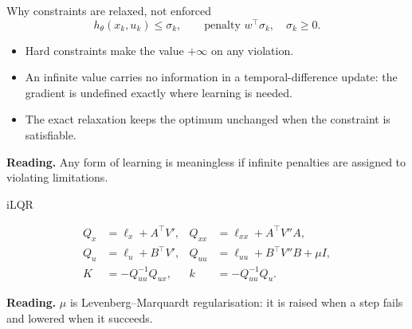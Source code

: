 \documentclass[10pt]{beamer}
\newcommand{\takeaway}[1]{\par\vfill{\footnotesize\textbf{Reading.} #1\par}}
\begin{document}
\begin{frame}{Why constraints are relaxed, not enforced}
  \[
    h_\theta(x_k,u_k)\le\sigma_k,
    \qquad\text{penalty } w^{\!\top}\sigma_k,\quad \sigma_k\ge0 .
  \]
  \begin{itemize}
    \item Hard constraints make the value $+\infty$ on any violation.
    \item An infinite value carries no information in a temporal-difference
      update: the gradient is undefined exactly where learning is needed.
    \item The exact relaxation keeps the optimum unchanged when the
      constraint is satisfiable.
  \end{itemize}
  \takeaway{Any form of learning is meaningless if infinite penalties are
    assigned to violating limitations.}
\end{frame}

\begin{frame}{iLQR}
  \centering
  \vspace{2pt}
  \small
  \begin{align*}
    Q_x &= \ell_x+A^{\!\top}V', &
    Q_{xx} &= \ell_{xx}+A^{\!\top}V''A,\\
    Q_u &= \ell_u+B^{\!\top}V', &
    Q_{uu} &= \ell_{uu}+B^{\!\top}V''B+\mu I,\\
    K &= -Q_{uu}^{-1}Q_{ux}, & k &= -Q_{uu}^{-1}Q_u .
  \end{align*}
  \normalsize
  \takeaway{$\mu$ is Levenberg--Marquardt regularisation: it is raised when a
    step fails and lowered when it succeeds.}
\end{frame}
\end{document}

